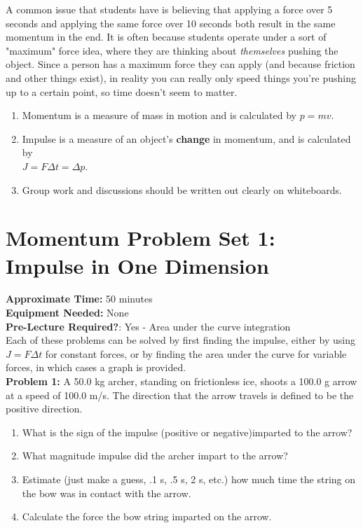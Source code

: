 \begin{tutorialbox}[title=Student Issue 1: Forces over Time]
A common issue that students have is believing that applying a force
over 5 seconds and applying the same force over 10 seconds both result in the same 
momentum in the end.  It is often because students operate under a sort of "maximum" 
force idea, where they are thinking about \textit{themselves} pushing the object.
Since a person has a maximum force they can apply (and because friction and other things
exist), in reality you can really only speed things you're pushing up to a certain point, 
so time doesn't seem to matter. 
\end{tutorialbox}

\begin{problembox}[title=Learning Outcomes]
\begin{enumerate}[label=(\alph*)]
    \item Momentum is a measure of mass in motion and is calculated by $p = mv$.
    \item Impulse is a measure of an object's \textbf{change} in momentum, and is calculated by \\ $J = F \Delta t = \Delta p$.
    \item Group work and discussions should be written out clearly on whiteboards.
\end{enumerate}
\end{problembox}

\newpage
\section{Momentum Problem Set 1: Impulse in One Dimension}
\textbf{Approximate Time:} 50 minutes \\
\textbf{Equipment Needed:} None \\
\textbf{Pre-Lecture Required?}: Yes - Area under the curve integration\\

Each of these problems can be solved by first finding the impulse, either by using
$J = F \Delta t$ for constant forces, or by finding the area under the curve for variable forces, 
in which cases a graph is provided.\\


\noindent
\textbf{Problem 1:} A 50.0 kg archer, standing on frictionless ice, shoots a 100.0 g 
arrow at a speed of 100.0 m/s. The direction that the arrow travels is defined to 
be the positive direction.
\begin{enumerate}[label=(\alph*)]
    \item What is the sign of the impulse (positive or negative)imparted to the arrow?
    \item What magnitude impulse did the archer impart to the arrow?
    \item Estimate (just make a guess, .1 s, .5 s, 2 s, etc.) how much time the string on the bow was in contact with the arrow.
    \item Calculate the force the bow string imparted on the arrow.
\end{enumerate}